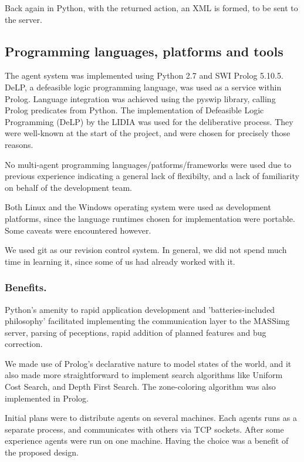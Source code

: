 \documentclass{llncs2e/llncs}
\begin{document}
    Back again in Python, with the returned action, an XML is formed, to be sent 
    to the server.

\subsection{Programming languages, platforms and tools}

    The agent system was implemented using Python 2.7 and SWI Prolog 5.10.5. DeLP, 
    a defeasible logic programming language, was used as a service within Prolog.
    Language integration was achieved using the pyswip library, calling Prolog 
    predicates from Python. The implementation of Defeasible Logic Programming 
    (DeLP) by the LIDIA was used for the deliberative process. They were 
    well-known at the start of the project, and were chosen for precisely those
    reasons.

    No multi-agent programming languages/patforms/frameworks were used due to 
    previous experience indicating a general lack of flexibilty, and a lack of 
    familiarity on behalf of the development team.
    
    Both Linux and the Windows operating system were used as development 
    platforms, since the language runtimes chosen for implementation were 
    portable. Some caveats were encountered however.

    We used git as our revision control system. In general, we did not spend much 
    time in learning it, since some of us had already worked with it.

\subsubsection{Benefits.}
    
    Python's amenity to rapid application development and 'batteries-included 
    philosophy' facilitated implementing the communication layer to the MASSimg 
    server, parsing of peceptions, rapid addition of planned features and bug 
    correction.

    We made use of Prolog's declarative nature to model states of the world, and it 
    also made more straightforward to implement search algorithms like Uniform Cost 
    Search, and Depth First Search. The zone-coloring algorithm was also 
    implemented in Prolog.

    Initial plans were to distribute agents on several machines. Each agents runs 
    as a separate process, and communicates with others via TCP sockets. After 
    some experience agents were run on one machine. Having the choice was a 
    benefit of the proposed design.
\end{document}
